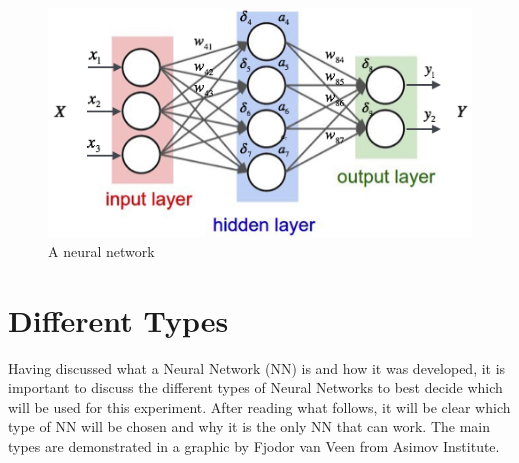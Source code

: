 \documentclass[12pt]{article}
\begin{document}
\begin{figure}[H]
  \includegraphics[width=\linewidth]{images/nn.png}
  \caption{A neural network \cite{valkov_2017}}
\end{figure}

\section{Different Types}
\quad Having discussed what a Neural Network (NN) is and how it was developed, it is important to discuss the different types of Neural Networks to best decide which will be used for this experiment. After reading what follows, it will be clear which type of NN will be chosen and why it is the only NN that can work. The main types are demonstrated in a graphic by Fjodor van Veen from Asimov Institute.  \cite{maladkar_2018}
\end{document}
